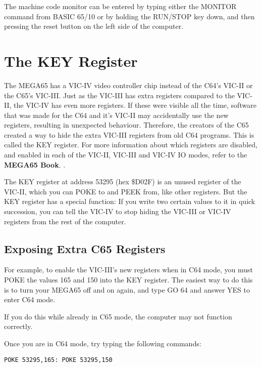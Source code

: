 The machine code monitor can be entered by typing either the MONITOR
command from BASIC 65/10 or by holding the RUN/STOP key
down, and then pressing the reset button on the left side of the
computer.

\section{The KEY Register}

The MEGA65 has a VIC-IV video controller chip instead of the C64's VIC-II or
the C65's VIC-III.  Just as the VIC-III has extra registers compared to the
VIC-II, the VIC-IV has even more registers.  If these were visible all the time,
software that was made for the C64 and it's VIC-II may accidentally use the
new registers, resulting in unexpected behaviour.  Therefore, the
creators of the C65 created a way to hide the extra VIC-III registers from old
C64 programs. This is called the KEY register. For more information
about which registers are disabled, and enabled in each of the
VIC-II, VIC-III and VIC-IV IO modes, refer to
\ifdefined\printmanual
 the {\bf MEGA65 Book}.
\else
 .
\fi


The KEY register at address 53295 (hex \$D02F) is an unused register of the VIC-II, which you can POKE to and
PEEK from, like other registers.  But the KEY register has a special function: If
you write two certain values to it in quick succession, you can tell the VIC-IV
to stop hiding the VIC-III or VIC-IV registers from the rest of the computer.

\subsection{Exposing Extra C65 Registers}

For example, to enable the VIC-III's new registers when in C64 mode, you must POKE the values 165 and 150
into the KEY register. The easiest way to do this is to turn your MEGA65 off and on again, and type GO 64
and answer YES to enter C64 mode.

If you do this while already in C65 mode, the computer may not function correctly.

Once you are in C64 mode, try typing the following commands:

\begin{tcolorbox}[colback=black,coltext=white]
\verbatimfont{\codefont}
\begin{verbatim}
POKE 53295,165: POKE 53295,150
\end{verbatim}
\end{tcolorbox}

